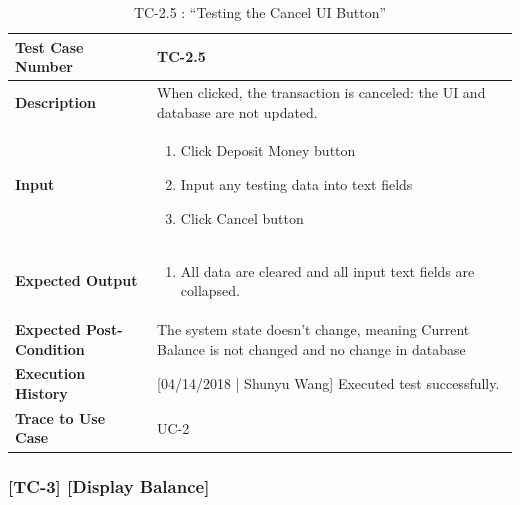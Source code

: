 \documentclass[12pt]{article}
\begin{document}
\begin{table}[H]
\caption{TC-2.5 : “Testing the Cancel UI Button”}
\begin{center}
\begin{tabular}{|p{5.5	cm}|p{11cm}|}
\hline
\bf Test Case Number & 
TC-2.5 \\
\hline
\bf Description & 
When clicked, the transaction is canceled: the UI and database are not updated.\\
\hline
\bf Input & 
\begin{enumerate}
  \item Click Deposit Money button
  \item Input any testing data into text fields
  \item Click Cancel button
\end{enumerate} \\
\hline
\bf Expected Output & 
\begin{enumerate}
  \item All data are cleared and all input text fields are collapsed.
\end{enumerate} \\
\hline
\bf Expected Post-Condition & 
The system state doesn’t change, meaning Current Balance is not changed and no change in database\\
\hline
\bf Execution History & 
[04/14/2018 | Shunyu Wang] Executed test successfully.\\
\hline
\bf Trace to Use Case & 
UC-2\\
\hline

\end{tabular}
\end{center}
\end{table}

\subsubsection{[TC-3] [Display Balance]} \label{tc:3}
\end{document}

